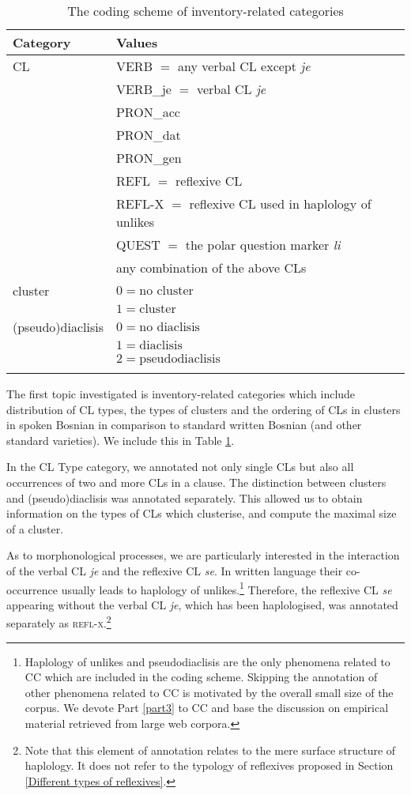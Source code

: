 \begin{table}
\caption{The coding scheme of inventory-related categories\label{T9.2}}
\begin{tabularx}{\textwidth}{Xl}
\lsptoprule
  Category & Values\\\midrule
  CL & VERB $=$ any verbal CL except \textit{je}\\
     & VERB\_je $=$ verbal CL \textit{je}\\
     & PRON\_acc\\
     & PRON\_dat\\
     & PRON\_gen\\
     & REFL $=$ reflexive CL\\
     & REFL-X $=$ reflexive CL used in haplology of unlikes\\
     & QUEST $=$ the polar question marker \textit{li}\\
     & any combination of the above CLs\\
  cluster & $0 = \text{no cluster}$\\
     & $1 = \text{cluster}$\\
  (pseudo)diaclisis & $0 = \text{no diaclisis}$\\
     & $1 = \text{diaclisis}$\\
     & $2 = \text{pseudodiaclisis}$\\
\lspbottomrule
\end{tabularx}
\end{table}

The first topic investigated is inventory-related categories which include distribution of CL types, the types of clusters and the ordering of CLs in clusters in spoken Bosnian in comparison to standard written Bosnian (and other standard varieties). We include this in Table \ref{T9.2}. 

In the CL Type category, we annotated not only single CLs but also all occurrences of two and more CLs in a clause. The distinction between clusters and (pseudo)diaclisis was annotated separately. This allowed us to obtain information on the types of CLs which clusterise, and compute the maximal size of a cluster. 

As to morphonological processes, we are particularly interested in the interaction of the verbal CL \textit{je} and the reflexive CL \textit{se}. In written language their co-occurrence usually leads to haplology of unlikes.\footnote{Haplology of unlikes and pseudodiaclisis are the only phenomena related to CC which are included in the coding scheme. Skipping the annotation of other phenomena related to CC is motivated by the overall small size of the corpus. We devote Part \ref{part3} to CC and base the discussion on empirical material retrieved from large web corpora.} Therefore, the reflexive CL \textit{se} appearing without the verbal CL \textit{je}, which has been haplologised, was annotated separately as \textsc{refl-x}.\footnote{Note that this element of annotation relates to the mere surface structure of haplology. It does not refer to the typology of reflexives proposed in Section \ref{Different types of reflexives}.}  

